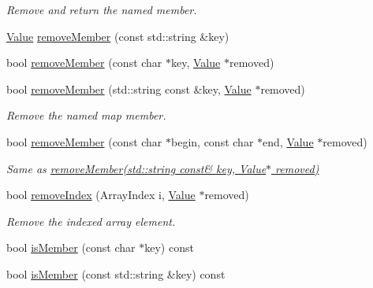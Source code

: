 \begin{DoxyCompactItemize}
\begin{DoxyCompactList}\small\item\em Remove and return the named member. \end{DoxyCompactList}\item 
\hyperlink{class_json_1_1_value}{Value} \hyperlink{class_json_1_1_value_ae1f95f7ca3906e6bcc2a7be93210ecba}{remove\+Member} (const std\+::string \&key)
\item 
bool \hyperlink{class_json_1_1_value_a708e599489adf30d65bf85a8ee16e6fb}{remove\+Member} (const char $\ast$key, \hyperlink{class_json_1_1_value}{Value} $\ast$removed)
\item 
bool \hyperlink{class_json_1_1_value_a3749dae413a73eac05b7f8dc6deeb6a2}{remove\+Member} (std\+::string const \&key, \hyperlink{class_json_1_1_value}{Value} $\ast$removed)
\begin{DoxyCompactList}\small\item\em Remove the named map member. \end{DoxyCompactList}\item 
\mbox{\label{class_json_1_1_value_a49c91af727d6b4eb0af02a81bb2def87}} 
bool \hyperlink{class_json_1_1_value_a49c91af727d6b4eb0af02a81bb2def87}{remove\+Member} (const char $\ast$begin, const char $\ast$end, \hyperlink{class_json_1_1_value}{Value} $\ast$removed)
\begin{DoxyCompactList}\small\item\em Same as \hyperlink{class_json_1_1_value_a3749dae413a73eac05b7f8dc6deeb6a2}{remove\+Member(std\+::string const\& key, Value$\ast$ removed)} \end{DoxyCompactList}\item 
bool \hyperlink{class_json_1_1_value_ae9e67e08a85a2f3be3396ec0f4c47f65}{remove\+Index} (Array\+Index i, \hyperlink{class_json_1_1_value}{Value} $\ast$removed)
\begin{DoxyCompactList}\small\item\em Remove the indexed array element. \end{DoxyCompactList}\item 
bool \hyperlink{class_json_1_1_value_ad6d4df2227321bab05e86667609a7fad}{is\+Member} (const char $\ast$key) const
\item 
bool \hyperlink{class_json_1_1_value_a0a098bdc6ce5ade1722584c22297adac}{is\+Member} (const std\+::string \&key) const
\item 
\mbox{\label{class_json_1_1_value_a2007e1e51f21f44ecf1f13e4a1c567b9}} 

\end{DoxyCompactItemize}
